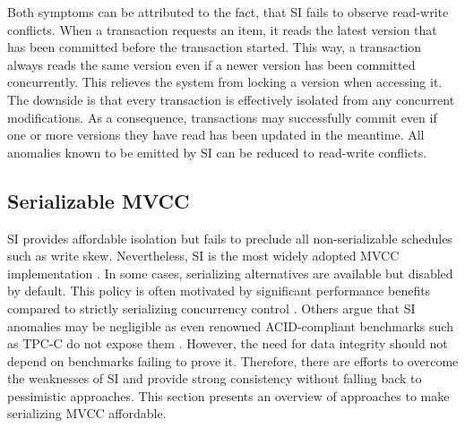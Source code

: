 
Both symptoms can be attributed to the fact, that \ac{SI} fails to observe
read-write conflicts. When a transaction requests an item, it reads the latest
version that has been committed before the transaction started. This way, a
transaction always reads the same version even if a newer version has been
committed concurrently. This relieves the system from locking a version when
accessing it. The downside is that every transaction is effectively isolated
from any concurrent modifications. As a consequence, transactions may
successfully commit even if one or more versions they have read has been updated
in the meantime. All anomalies known to be emitted by \ac{SI} can be reduced to
read-write conflicts.

\subsection{Serializable MVCC}

\acl{SI} provides affordable isolation but fails to preclude all
non-serializable schedules such as write skew. Nevertheless, \ac{SI} is the most
widely adopted \ac{MVCC} implementation \cite{larson2011high,
bailey2013exploring, neumann2015fast}. In some cases, serializing alternatives
are available but disabled by default. This policy is often motivated by
significant performance benefits compared to strictly serializing concurrency
control \cite{cahill2009serializable}. Others argue that \ac{SI} anomalies may
be negligible as even renowned ACID-compliant benchmarks such as TPC-C do not
expose them \cite{fekete2005making}. However, the need for data integrity should
not depend on benchmarks failing to prove it. Therefore, there are efforts to
overcome the weaknesses of \ac{SI} and provide strong consistency without
falling back to pessimistic approaches. This section presents an overview of
approaches to make serializing \ac{MVCC} affordable.

